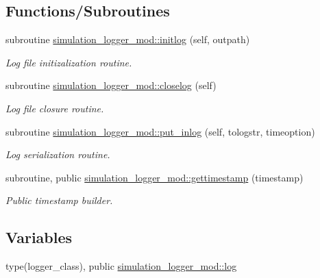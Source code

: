 \subsection*{Functions/\+Subroutines}
\begin{DoxyCompactItemize}
\item 
subroutine \hyperlink{namespacesimulation__logger__mod_abf603e657da9104a8060ab53c72f0aca}{simulation\+\_\+logger\+\_\+mod\+::initlog} (self, outpath)
\begin{DoxyCompactList}\small\item\em Log file initizalization routine. \end{DoxyCompactList}\item 
subroutine \hyperlink{namespacesimulation__logger__mod_aa6d1aaea74403186da0f98afb74ecebe}{simulation\+\_\+logger\+\_\+mod\+::closelog} (self)
\begin{DoxyCompactList}\small\item\em Log file closure routine. \end{DoxyCompactList}\item 
subroutine \hyperlink{namespacesimulation__logger__mod_a34980631cfcf2d2172aa3b491acace4c}{simulation\+\_\+logger\+\_\+mod\+::put\+\_\+inlog} (self, tologstr, timeoption)
\begin{DoxyCompactList}\small\item\em Log serialization routine. \end{DoxyCompactList}\item 
subroutine, public \hyperlink{namespacesimulation__logger__mod_a0326a5eeb649b041064a01d96aef0989}{simulation\+\_\+logger\+\_\+mod\+::gettimestamp} (timestamp)
\begin{DoxyCompactList}\small\item\em Public timestamp builder. \end{DoxyCompactList}\end{DoxyCompactItemize}
\subsection*{Variables}
\begin{DoxyCompactItemize}
\item 
type(logger\+\_\+class), public \hyperlink{namespacesimulation__logger__mod_aa778de9905350741e1f40bb04fdc1cf6}{simulation\+\_\+logger\+\_\+mod\+::log}
\end{DoxyCompactItemize}
